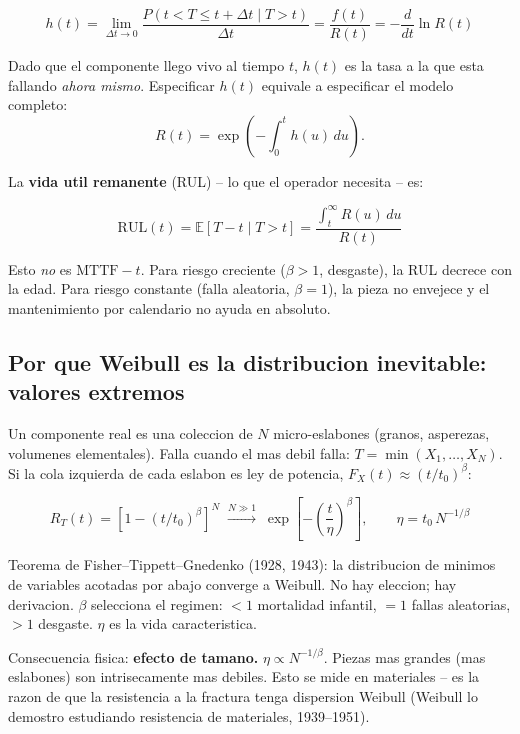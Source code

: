 \documentclass[10.5pt,a4paper]{article}
\begin{document}
\begin{mathbox}
$$h(t) = \lim_{\Delta t \to 0} \frac{P(t < T \leq t+\Delta t \mid T > t)}{\Delta t}
       = \frac{f(t)}{R(t)} = -\frac{d}{dt}\ln R(t)$$

Dado que el componente llego vivo al tiempo $t$, $h(t)$ es la tasa a la que esta
fallando \textit{ahora mismo}. Especificar $h(t)$ equivale a especificar el modelo completo:
$$R(t) = \exp\!\left(-\int_0^t h(u)\,du\right).$$
\end{mathbox}

La \textbf{vida util remanente} (RUL) -- lo que el operador necesita -- es:

\begin{mathbox}
$$\mathrm{RUL}(t) = \mathbb{E}[T - t \mid T > t]
                 = \frac{\displaystyle\int_t^\infty R(u)\,du}{R(t)}$$

Esto \textit{no} es $\mathrm{MTTF} - t$. Para riesgo creciente ($\beta > 1$, desgaste), la RUL
decrece con la edad. Para riesgo constante (falla aleatoria, $\beta = 1$), la pieza
no envejece y el mantenimiento por calendario no ayuda en absoluto.
\end{mathbox}

\subsection{Por que Weibull es la distribucion inevitable: valores extremos}

Un componente real es una coleccion de $N$ micro-eslabones (granos, asperezas,
volumenes elementales). Falla cuando el mas debil falla:
$T = \min(X_1, \dots, X_N)$. Si la cola izquierda de cada eslabon es ley de
potencia, $F_X(t) \approx (t/t_0)^\beta$:

\begin{mathbox}
$$R_T(t) = [1 - (t/t_0)^\beta]^N \;\xrightarrow{N \gg 1}\;
  \exp\!\left[-\left(\frac{t}{\eta}\right)^\beta\right], \qquad
  \eta = t_0\,N^{-1/\beta}$$

Teorema de Fisher--Tippett--Gnedenko (1928, 1943): la distribucion de minimos de
variables acotadas por abajo converge a Weibull. No hay eleccion; hay derivacion.
$\beta$ selecciona el regimen: $<1$ mortalidad infantil, $=1$ fallas aleatorias,
$>1$ desgaste. $\eta$ es la vida caracteristica.
\end{mathbox}

Consecuencia fisica: \textbf{efecto de tamano.} $\eta \propto N^{-1/\beta}$.
Piezas mas grandes (mas eslabones) son intrisecamente mas debiles. Esto se mide
en materiales -- es la razon de que la resistencia a la fractura tenga dispersion
Weibull (Weibull lo demostro estudiando resistencia de materiales, 1939--1951).
\end{document}
